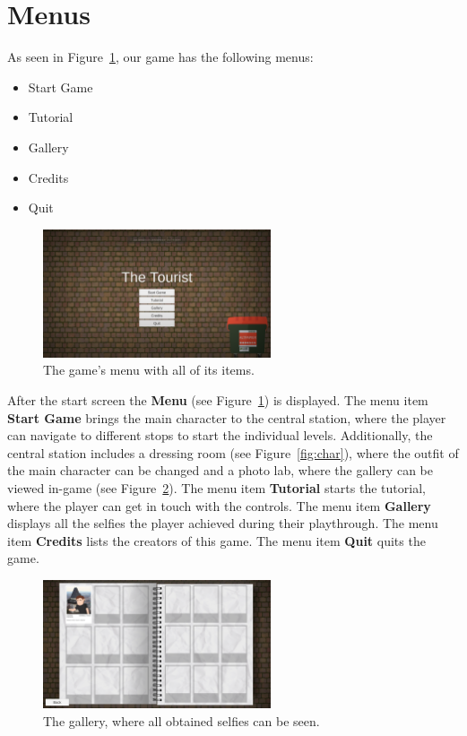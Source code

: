 \documentclass[a4paper]{scrreprt}
\begin{document}
\section{Menus}

As seen in Figure~\ref{fig:menu}, our game has the following menus:
\begin{itemize}
\item Start Game
\item Tutorial
\item Gallery
\item Credits
\item Quit
\end{itemize}

\begin{figure}[h]
\centering
\includegraphics[width=0.6\textwidth]{menu.png}
\caption{The game's menu with all of its items.}
\label{fig:menu}
\end{figure}

\noindent After the start screen the \textbf{Menu} (see Figure~\ref{fig:menu}) is displayed. The menu item \textbf{Start Game} brings the main character to the central station, where the player can navigate to different stops to start the individual levels. Additionally, the central station includes a dressing room (see Figure~\ref{fig:char}), where the outfit of the main character can be changed and a photo lab, where the gallery can be viewed in-game (see Figure~\ref{fig:gallery}).
The menu item \textbf{Tutorial} starts the tutorial, where the player can get in touch with the controls. The menu item \textbf{Gallery} displays all the selfies the player achieved during their playthrough. The menu item \textbf{Credits} lists the creators of this game. The menu item \textbf{Quit} quits the game.



\begin{figure}[h]
\centering
\includegraphics[width=0.6\textwidth]{gallery.png}
\caption{The gallery, where all obtained selfies can be seen.}
\label{fig:gallery}
\end{figure}
\end{document}
